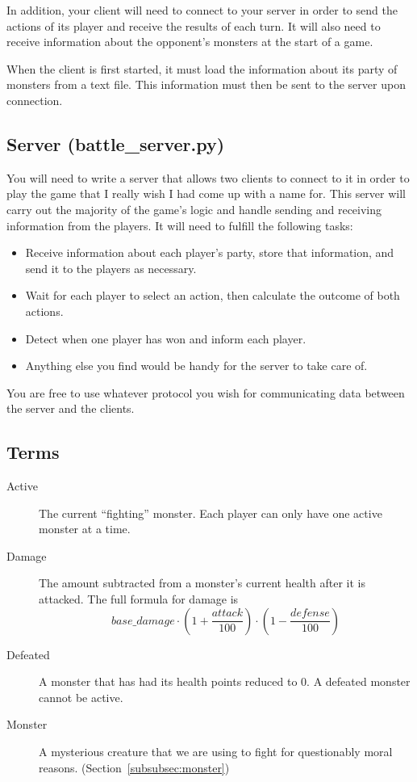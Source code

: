 \documentclass[11pt]{cselabheader}
\begin{document}
In addition, your client will need to connect to your server in order to send the
actions of its player and receive the results of each turn. It will also need to
receive information about the opponent's monsters at the start of a game.

When the client is first started, it must load the information about its party
of monsters from a text file. This information must then be sent to the server upon
connection.

\subsection{Server (battle\_server.py)}
You will need to write a server that allows two clients to connect to it in order
to play the game that I really wish I had come up with a name for. This server will
carry out the majority of the game's logic and handle sending and receiving information
from the players. It will need to fulfill the following tasks:

\begin{itemize}
\item Receive information about each player's party, store that information, and
  send it to the players as necessary.
\item Wait for each player to select an action, then calculate the outcome of
  both actions.
\item Detect when one player has won and inform each player.
\item Anything else you find would be handy for the server to take care of.
\end{itemize}

You are free to use whatever protocol you wish for communicating data between the
server and the clients.



\subsection{Terms}

\begin{description}
\item[Active] The current ``fighting'' monster. Each player can only have one
  active monster at a time.
\item[Damage] The amount subtracted from a monster's current health after it is
  attacked. The full formula for damage is $$base\_damage \cdot \left(1 +
  \frac{attack}{100}\right) \cdot \left(1 - \frac{defense}{100}\right)$$
\item[Defeated] A monster that has had its health points reduced to 0. A
  defeated monster cannot be active.
\item[Monster] A mysterious creature that we are using to fight for questionably
  moral reasons. (Section~\ref{subsubsec:monster})
\end{description}
\end{document}
